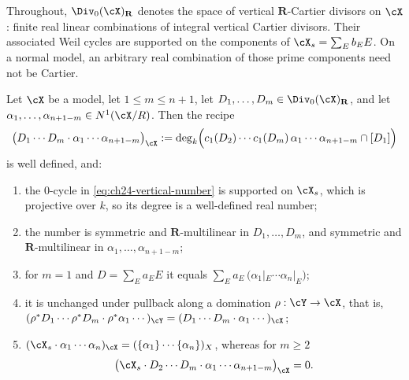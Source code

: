 Throughout, $\Div_0(\cX)_{\mathbf R}$ denotes the space of vertical
$\mathbf R$-Cartier divisors on $\cX$: finite real linear combinations
of integral vertical Cartier divisors.  Their associated Weil cycles are
supported on the components of $\cX_s=\sum_Eb_EE$.  On a normal model,
an arbitrary real combination of those prime components need not be
Cartier.

\begin{lemma}
\label{lem:ch24-vertical-numbers}
Let $\cX$ be a model, let $1\leq m\leq n+1$, let
$D_1,\ldots,D_m\in\Div_0(\cX)_{\mathbf R}$, and let
$\alpha_1,\ldots,\alpha_{n+1-m}\in N^1(\cX/R)$.  Then the recipe
\begin{equation}
\label{eq:ch24-vertical-number}
 \bigl(D_1\cdots D_m\cdot\alpha_1\cdots\alpha_{n+1-m}\bigr)_{\cX}
 :=\deg_k\Bigl(
   c_1(D_2)\cdots c_1(D_m)\,\alpha_1\cdots\alpha_{n+1-m}\cap[D_1]
   \Bigr)
\end{equation}
is well defined, and:
\begin{enumerate}
\item\label{itm:ch24-vn:welldef} the $0$-cycle in
 \eqref{eq:ch24-vertical-number} is supported on $\cX_s$, which is
 projective over $k$, so its degree is a well-defined real number;
\item\label{itm:ch24-vn:sym} the number is symmetric and
 $\mathbf R$-multilinear in $D_1,\ldots,D_m$, and symmetric and
 $\mathbf R$-multilinear in $\alpha_1,\ldots,\alpha_{n+1-m}$;
\item\label{itm:ch24-vn:m1} for $m=1$ and $D=\sum_Ea_EE$ it equals
 $\sum_Ea_E\,\bigl(\alpha_1|_E\cdots\alpha_n|_E\bigr)$;
\item\label{itm:ch24-vn:pullback} it is unchanged under pullback along a
 domination $\rho:\cY\to\cX$, that is,
 $(\rho^*D_1\cdots\rho^*D_m\cdot\rho^*\alpha_1\cdots)_{\cY}
   =(D_1\cdots D_m\cdot\alpha_1\cdots)_{\cX}$;
\item\label{itm:ch24-vn:fibre} $(\cX_s\cdot\alpha_1\cdots\alpha_n)_{\cX}
 =(\{\alpha_1\}\cdots\{\alpha_n\})_X$, whereas for $m\geq2$
 \[
  \bigl(\cX_s\cdot D_2\cdots D_m\cdot\alpha_1\cdots\alpha_{n+1-m}\bigr)_{\cX}
  =0 .
 \]
\end{enumerate}
\end{lemma}

